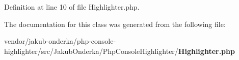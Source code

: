 Definition at line 10 of file Highlighter.\+php.



The documentation for this class was generated from the following file\+:\begin{DoxyCompactItemize}
\item 
vendor/jakub-\/onderka/php-\/console-\/highlighter/src/\+Jakub\+Onderka/\+Php\+Console\+Highlighter/{\bf Highlighter.\+php}\end{DoxyCompactItemize}
